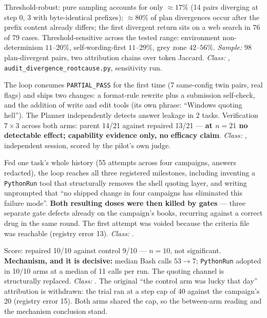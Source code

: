 \begin{description}[leftmargin=0pt,style=nextline,font=\normalfont,itemsep=6pt]
\item[\textbf{F25}\quad Divergence root cause, at content level.]
Threshold-robust: pure sampling accounts for only $\approx 17\%$ (14 pairs
diverging at step 0, 3 with byte-identical prefixes); $\approx 80\%$ of
plan divergences occur after the prefix content already differs; the first
divergent return sits on a web search in 76 of 79 cases.
Threshold-sensitive across the tested range: environment
non-determinism $11$--$20\%$, self-wording-first $11$--$29\%$, grey zone
$42$--$56\%$. \emph{Sample:} 98 plan-divergent pairs, two attribution
chains over token Jaccard. \emph{Class:} ,
\texttt{audit\_divergence\_rootcause.py}, sensitivity run.

\item[\textbf{F26}\quad Twin-feeding probe, end to end.]
The loop consumes \texttt{PARTIAL\_PASS} for the first time (7 same-config
twin pairs, real flags) and ships two changes: a format-rule rewrite plus a
submission self-check, and the addition of write and edit tools (its own
phrase: ``Windows quoting hell''). The Planner independently detects answer
leakage in 2 tasks. Verification $7 \times 3$ across both arms: parent
14/21 against repaired 13/21 --- \textbf{at $n=21$ no detectable effect;
capability evidence only, no efficacy claim}. \emph{Class:} ,
independent session, scored by the pilot's own judge.

\item[\textbf{F27}\quad Episodic dossier probe, isolated re-run.]
Fed one task's whole history (55 attempts across four campaigns, answers
redacted), the loop reaches all three registered milestones, including
inventing a \texttt{PythonRun} tool that structurally removes the shell
quoting layer, and writing unprompted that ``no shipped change in four
campaigns has eliminated this failure mode''. \textbf{Both resulting doses
were then killed by gates} --- three separate gate defects already on the
campaign's books, recurring against a correct drug in the same round. The
first attempt was voided because the criteria file was reachable (registry
error 13). \emph{Class:} .

\item[\textbf{F28}\quad Trialling a gate-killed drug, $10 \times 10$.]
Score: repaired 10/10 against control 9/10 --- $n=10$, not significant.
\textbf{Mechanism, and it is decisive:} median Bash calls $53 \to 7$;
\texttt{PythonRun} adopted in 10/10 arms at a median of 11 calls per run.
The quoting channel is structurally replaced. \emph{Class:} . The
original ``the control arm was lucky that day'' attribution is withdrawn:
the trial ran at a step cap of 40 against the campaign's 20 (registry
error 15). Both arms shared the cap, so the between-arm reading and the
mechanism conclusion stand.


\end{description}
